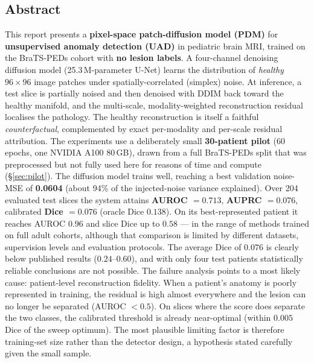 \documentclass[12pt, a4paper]{article}
\theoremstyle{definition}\newtheorem{definition}{Definition}
\begin{document}
\thispagestyle{empty}
\vspace*{\fill}
\begin{center}\begin{minipage}{0.86\textwidth}
\section*{Abstract}
This report presents a \textbf{pixel-space patch-diffusion model (PDM)} for
\textbf{unsupervised anomaly detection (UAD)} in pediatric brain MRI, trained on the
BraTS-PEDs cohort with \textbf{no lesion labels}. A four-channel denoising diffusion model
(25.3\,M-parameter U-Net) learns the distribution of \emph{healthy} $96{\times}96$
image patches under spatially-correlated (simplex) noise. At inference, a test slice
is partially noised and then denoised with DDIM back toward the healthy manifold, and
the multi-scale, modality-weighted reconstruction residual localises the pathology.
The healthy reconstruction is itself a faithful \emph{counterfactual}, complemented by
exact per-modality and per-scale residual attribution. The experiments use a
deliberately small \textbf{30-patient pilot} (60 epochs, one NVIDIA A100 80\,GB), drawn
from a full BraTS-PEDs split that was preprocessed but not fully used here for reasons
of time and compute (\S\ref{sec:pilot}). The diffusion model trains well, reaching a
best validation noise-MSE of \textbf{0.0604} (about 94\% of the injected-noise variance
explained). Over 204 evaluated test slices the system attains
\textbf{AUROC $=0.713$}, \textbf{AUPRC $=0.076$}, calibrated \textbf{Dice $=0.076$}
(oracle Dice $0.138$). On its best-represented patient it reaches AUROC $0.96$ and slice
Dice up to $0.58$ --- in the range of methods trained on full adult cohorts, although
that comparison is limited by different datasets, supervision levels and evaluation
protocols. The average Dice of $0.076$ is clearly below published results
($0.24$--$0.60$), and with only four test patients statistically reliable conclusions
are not possible. The failure analysis points to a most likely cause: patient-level
reconstruction fidelity. When a patient's anatomy is poorly represented in training, the
residual is high almost everywhere and the lesion can no longer be separated
(AUROC $<0.5$). On slices where the score does separate the two classes, the calibrated
threshold is already near-optimal (within $0.005$ Dice of the sweep optimum). The most
plausible limiting factor is therefore training-set size rather than the detector design,
a hypothesis stated carefully given the small sample.
\end{minipage}\end{center}
\vspace*{\fill}\clearpage
\end{document}
